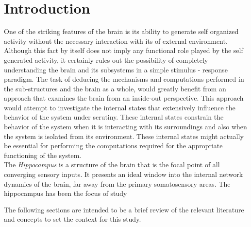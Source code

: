 
\chapter{Introduction} 

\label{intro}

One of the striking features of the brain is its ability to generate self organized activity without the necessary interaction with its of external environment. Although this fact by itself does not imply any functional role played by the self generated activity, it certainly rules out the possibility of completely understanding the brain and its subsystems in a simple stimulus - response paradigm. The task of deducing the mechanisms and computations performed in the sub-structures and  the brain as a whole, would greatly benefit from an approach that examines the brain from an inside-out perspective. This approach would attempt to investigate the internal states that extensively influence the behavior of the system under scrutiny. These internal states constrain the behavior of the system when it is interacting with its surroundings and also when the system is isolated from its environment. These internal states might actually be essential for performing the computations required for the appropriate functioning of the system. \\
The \emph{Hippocampus} is a structure of the brain that is the focal point of all converging sensory inputs. It presents an ideal window into the internal network dynamics of the brain, far away from the primary somatosensory areas. The hippocampus has been the focus of study 



The following sections are intended to be a brief review of the relevant literature and concepts to set the context for this study.





%
%
%
%

